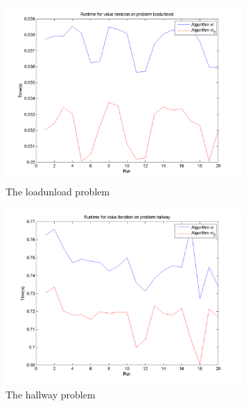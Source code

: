 \documentclass[10pt,a4paper]{article}
\begin{document}
\begin{figure}
\vspace{-20pt}
\hspace{-30pt}
\centering
\includegraphics[width=0.8\textwidth]{Timings/loadunload/timings_vi.png}
\hspace{-30pt}
\caption{The loadunload problem}
\label{fig:vi_loadunload}
\vspace{-20pt}
\end{figure}

\begin{figure}
\vspace{-20pt}
\hspace{-30pt}
\centering
\includegraphics[width=0.8\textwidth]{Timings/hallway/timings_vi.png}
\caption{The hallway problem}
\hspace{-30pt}
\label{fig:vi_hallway}
\vspace{-20pt}
\end{figure}
        
\end{document}
